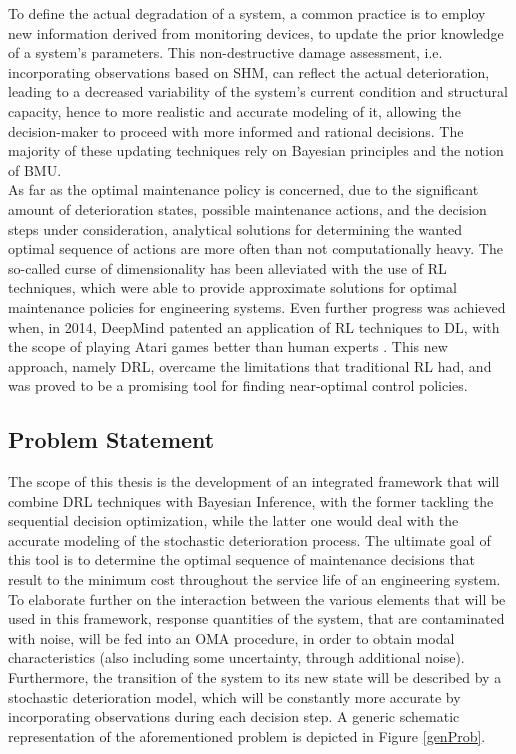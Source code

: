 To define the actual degradation of a system, a common practice is to employ new information derived from monitoring devices, to update the prior knowledge of a system's parameters. This non-destructive damage assessment, i.e. incorporating observations based on \gls{SHM}, can reflect the actual deterioration, leading to a decreased variability of the system's current condition and structural capacity, hence to more realistic and accurate modeling of it, allowing the decision-maker to proceed with more informed and rational decisions. The majority of these updating techniques rely on Bayesian principles and the notion of \gls{BMU}.\\

As far as the optimal maintenance policy is concerned, due to the significant amount of deterioration states, possible maintenance actions, and the decision steps under consideration, analytical solutions for determining the wanted optimal sequence of actions are more often than not computationally heavy. The so-called curse of dimensionality has been alleviated with the use of \gls{RL} techniques, which were able to provide approximate solutions for optimal maintenance policies for engineering systems. Even further progress was achieved when, in 2014, DeepMind patented an application of \gls{RL} techniques to \gls{DL}, with the scope of playing Atari games better than human experts \cite{mnih2013playing}. This new approach, namely \acrfull{DRL}, overcame the limitations that traditional \gls{RL} had, and was proved to be a promising tool for finding near-optimal control policies.




\subsection{Problem Statement} \label{ProbState}

The scope of this thesis is the development of an integrated framework that will combine \gls{DRL} techniques with Bayesian Inference, with the former tackling the sequential decision optimization, while the latter one would deal with the accurate modeling of the stochastic deterioration process. The ultimate goal of this tool is to determine the optimal sequence of maintenance decisions that result to the minimum cost throughout the service life of an engineering system. To elaborate further on the interaction between the various elements that will be used in this framework, response quantities of the system, that are contaminated with noise, will be fed into an \gls{OMA} procedure, in order to obtain modal characteristics (also including some uncertainty, through additional noise). Furthermore, the transition of the system to its new state will be described by a stochastic deterioration model, which will be constantly more accurate by incorporating observations during each decision step. A generic schematic representation of the aforementioned problem is depicted in Figure \ref{genProb}.

